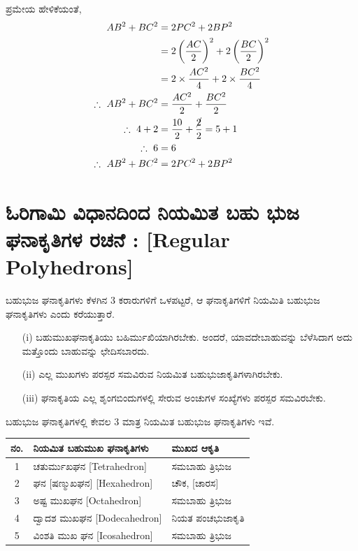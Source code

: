 ಪ್ರಮೇಯ ಹೇಳಿಕೆಯಂತೆ, 
\begin{align*}
AB^2 + BC^2 & = 2 PC^2 + 2 B P^2\\
& = 2 \left(\frac{AC}{2} \right)^2 + 2 \left(\frac{BC}{2} \right)^2\\
& = 2 \times \frac{AC^2}{4} + 2 \times \frac{BC^2}{4}\\
\therefore ~ AB^2 + BC^2 & = \frac{AC^2}{2} + \frac{BC^2}{2}\\
\therefore ~ 4+ 2 & = \frac{10}{2} + \frac{\cancel{2}}{2} = 5+1\\
\therefore ~ 6 & = 6 \\
\therefore ~ AB^2 + BC^2 & = 2 PC^2 + 2 BP^2 
\end{align*}

\section{ಓರಿಗಾಮಿ ವಿಧಾನದಿಂದ  ನಿಯಮಿತ ಬಹು ಭುಜ ಘನಾಕೃತಿಗಳ ರಚನೆ : [Regular Polyhedrons]}\label{sec1.11}%

ಬಹುಭುಜ ಘನಾಕೃತಿಗಳು ಕೆಳಗಿನ 3 ಕರಾರುಗಳಿಗೆ ಒಳಪಟ್ಟರೆ, ಆ ಘನಾಕೃತಿಗಳಿಗೆ ನಿಯಮಿತಿ ಬಹುಭುಜ ಘನಾಕೃತಿಗಳು ಎಂದು ಕರೆಯುತ್ತಾರೆ.

\smallskip

\begin{itemize}
\item[(i)] ಬಹುಮುಖಘನಾಕೃತಿಯು ಬಹಿರ್ಮುಖಿಯಾಗಿರಬೇಕು. ಅಂದರೆ, ಯಾವದೇ\break ಬಾಹುವನ್ನು ಬೆಳೆಸಿದಾಗ ಅದು ಮತ್ತೊಂದು ಬಾಹುವನ್ನು ಛೇದಿಸಬಾರದು.

\item[(ii)] ಎಲ್ಲ ಮುಖಗಳು ಪರಸ್ಪರ ಸಮವಿರುವ ನಿಯಮಿತ ಬಹುಭುಜಾಕೃತಿಗಳಾಗಿರಬೇಕು.

\item[(iii)] ಘನಾಕೃತಿಯ ಎಲ್ಲ ಶೃಂಗಬಿಂದುಗಳಲ್ಲಿ ಸೇರುವ ಅಂಚುಗಳ ಸಂಖ್ಯೆಗಳು ಪರಸ್ಪರ ಸಮವಿರಬೇಕು. 
\end{itemize}

ಬಹುಭುಜ ಘನಾಕೃತಿಗಳಲ್ಲಿ ಕೇವಲ 3 ಮಾತ್ರ ನಿಯಮಿತ ಬಹುಭುಜ ಘನಾಕೃತಿಗಳು ಇವೆ. 

\begin{tabular}{|c|l|l|}
\hline
ನಂ. & ನಿಯಮಿತ ಬಹುಮುಖ ಘನಾಕೃತಿಗಳು & ಮುಖದ ಆಕೃತಿ \\
\hline
1 & ಚತುರ್ಮುಖಘನ [Tetrahedron] &  ಸಮಬಾಹು ತ್ರಿಭುಜ\\
\hline
2 &ಘನ [ಷಣ್ಮುಖಘನ] [Hexahedron] &  ಚೌಕ, [ಚಾರಸ]\\
\hline
3 & ಅಷ್ಟ ಮುಖಘನ [Octahedron] & ಸಮಬಾಹು ತ್ರಿಭುಜ\\
\hline
4 & ದ್ವಾದಶ ಮುಖಘನ [Dodecahedron] & ನಿಯತ ಪಂಚಭುಜಾಕೃತಿ\\
\hline
5 & ವಿಂಶತಿ ಮುಖ ಘನ [Icosahedron] &  ಸಮಬಾಹು ತ್ರಿಭುಜ \\
\hline
\end{tabular}

